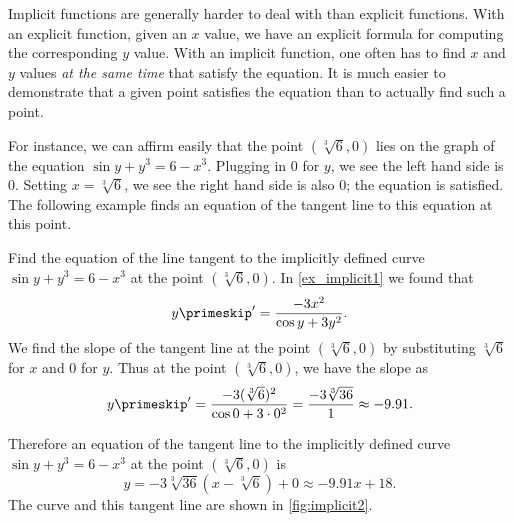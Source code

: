 Implicit functions are generally harder to deal with than explicit functions. With an explicit function, given an $x$ value, we have an explicit formula for computing the corresponding $y$ value. With an implicit function, one often has to find $x$ and $y$ values \emph{at the same time} that satisfy the equation. It is much easier to demonstrate that a given point satisfies the equation than to actually find such a point.

For instance, we can affirm easily that the point $(\sqrt[3]{6},0)$ lies on the graph of the equation $\sin y + y^3=6-x^3$. Plugging in $0$ for $y$, we see the left hand side is $0$. Setting $x=\sqrt[3]6$, we see the right hand side is also $0$; the equation is satisfied. The following example finds an equation of the tangent line to this equation at this point.

\begin{example}\label{ex_implicit2}%
Find the equation of the line tangent to the implicitly defined curve $\sin y + y^3=6-x^3$ at the point $(\sqrt[3]6,0)$.
\solution
In \autoref{ex_implicit1} we found that
\[y\primeskip' = \frac{-3x^2}{\cos y +3y^2}.\]
We find the slope of the tangent line at the point  $(\sqrt[3]6,0)$ by substituting $\sqrt[3]6$ for $x$ and $0$ for $y$. Thus at the point $(\sqrt[3]6,0)$, we have the slope as
\[y\primeskip' = \frac{-3(\sqrt[3]{6})^2}{\cos 0 + 3\cdot0^2} = \frac{-3\sqrt[3]{36}}{1} \approx -9.91.\]

Therefore an equation of the tangent line to the implicitly defined curve $\sin y + y^3=6-x^3$ at the point $(\sqrt[3]{6},0)$ is
\[y = -3\sqrt[3]{36}(x-\sqrt[3]{6})+0 \approx -9.91x+18.\]
The curve and this tangent line are shown in \autoref{fig:implicit2}.
\end{example}


